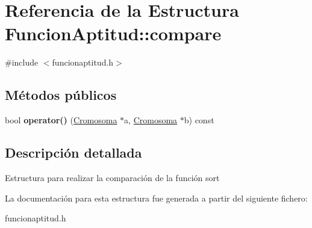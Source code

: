 \hypertarget{structFuncionAptitud_1_1compare}{\section{Referencia de la Estructura Funcion\-Aptitud\-:\-:compare}
\label{structFuncionAptitud_1_1compare}
}


{\ttfamily \#include $<$funcionaptitud.\-h$>$}

\subsection*{Métodos públicos}
\begin{DoxyCompactItemize}
\item 
\hypertarget{structFuncionAptitud_1_1compare_a2b620e0bb37ca9b4b0768810abd5bd19}{bool {\bfseries operator()} (\hyperlink{classCromosoma}{Cromosoma} $\ast$a, \hyperlink{classCromosoma}{Cromosoma} $\ast$b) const }\label{structFuncionAptitud_1_1compare_a2b620e0bb37ca9b4b0768810abd5bd19}

\end{DoxyCompactItemize}


\subsection{Descripción detallada}
Estructura para realizar la comparación de la función sort 

La documentación para esta estructura fue generada a partir del siguiente fichero\-:\begin{DoxyCompactItemize}
\item 
funcionaptitud.\-h\end{DoxyCompactItemize}
